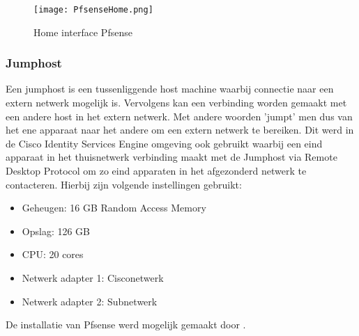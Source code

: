 \begin{figure}[H]
	\centering
	\texttt{[image: PfsenseHome.png]}
	\caption{Home interface Pfsense}
	\label{fig:Pfsense}
\end{figure}

\subsubsection{Jumphost}
Een jumphost is een tussenliggende host machine waarbij connectie naar een extern netwerk mogelijk is. Vervolgens kan een verbinding worden gemaakt met een andere host in het extern netwerk. Met andere woorden 'jumpt' men dus van het ene apparaat naar het andere om een extern netwerk te bereiken. 
\newline
\newline
Dit werd in de Cisco Identity Services Engine omgeving ook gebruikt waarbij een eind apparaat in het thuisnetwerk verbinding maakt met de Jumphost via Remote Desktop Protocol om zo eind apparaten in het afgezonderd netwerk te contacteren. Hierbij zijn volgende instellingen gebruikt:  

\begin{itemize}
	\item Geheugen: 16 GB Random Access Memory
	\item Opslag: 126 GB
	\item CPU: 20 cores
	\item Netwerk adapter 1: Cisco\textunderscore netwerk
	\item Netwerk adapter 2: Sub\textunderscore netwerk
\end{itemize}

De installatie van Pfsense werd mogelijk gemaakt door \cite{Pfsense_InstallationGuide}.

